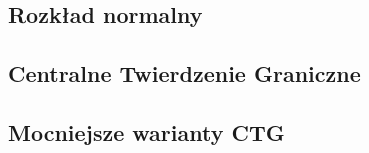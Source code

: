 \subsection{Rozkład normalny} 


\subsection{Centralne Twierdzenie Graniczne}


\subsection{Mocniejsze warianty CTG}

